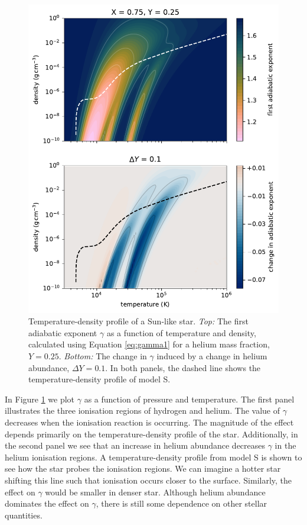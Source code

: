 \begin{figure}[!tb]
    \centering
    \includegraphics{figures/adiabatic-ionisation-temp.pdf}
    \caption{Temperature-density profile of a Sun-like star. \emph{Top:} The first adiabatic exponent \(\gamma\) as a function of temperature and density, calculated using Equation \ref{eq:gamma1} for a helium mass fraction, \(Y=0.25\). \emph{Bottom:} The change in \(\gamma\) induced by a change in helium abundance, \(\Delta Y = 0.1\). In both panels, the dashed line shows the temperature-density profile of model S.}
    \label{fig:gamma-temp-density}
\end{figure}

In Figure \ref{fig:gamma-temp-density} we plot \(\gamma\) as a function of pressure and temperature. The first panel illustrates the three ionisation regions of hydrogen and helium. The value of \(\gamma\) decreases when the ionisation reaction is occurring. The magnitude of the effect depends primarily on the temperature-density profile of the star. Additionally, in the second panel we see that an increase in helium abundance decreases \(\gamma\) in the helium ionisation regions. A temperature-density profile from model S is shown to see how the star probes the ionisation regions. We can imagine a hotter star shifting this line such that ionisation occurs closer to the surface. Similarly, the effect on \(\gamma\) would be smaller in denser star. Although helium abundance dominates the effect on \(\gamma\), there is still some dependence on other stellar quantities.

